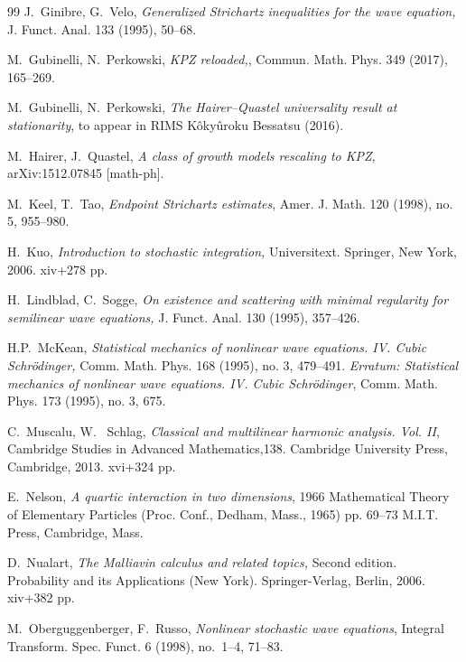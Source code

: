 \documentclass[letterpaper, 11pt,  reqno]{amsart}
\newcommand{\1}{\hspace{0.5mm}\text{I}\hspace{0.5mm}}
\numberwithin{equation}{section}
\numberwithin{theorem}{section}
\begin{document}
\begin{thebibliography}{99}
J.~Ginibre, G.~Velo, 
{\it Generalized Strichartz inequalities for the wave equation,} J. Funct. Anal. 133 (1995),
50--68.



M.~Gubinelli, N.~Perkowski, 
{\it   KPZ reloaded,},
Commun. Math. Phys. 349 (2017), 165--269.


M.~Gubinelli, N.~Perkowski, 
{\it The Hairer--Quastel universality result at stationarity}, 
 to appear in RIMS K\^oky\^uroku Bessatsu (2016).


M.~Hairer, J.~Quastel,
{\it A class of growth models rescaling to KPZ,}
arXiv:1512.07845 [math-ph].




M.~Keel, T.~Tao, {\it Endpoint Strichartz estimates},  Amer. J. Math. 120 (1998), no. 5, 955--980.


H.~Kuo, 
{\it Introduction to stochastic integration,} Universitext. Springer, New York, 2006. xiv+278 pp.


H.~Lindblad, C.~Sogge, {\it On existence and scattering with minimal regularity for semilinear wave equations,} J. Funct. Anal. 130 (1995), 357--426.




H.P.~McKean, 
{\it Statistical mechanics of nonlinear wave equations. IV. Cubic Schr\"odinger,} 
 Comm. Math. Phys. 168 (1995), no. 3, 479--491. 
 {\it Erratum: Statistical mechanics of nonlinear wave equations. IV. Cubic Schr\"odinger}, Comm. Math. Phys. 173 (1995), no. 3, 675.



C.~Muscalu, W.~ Schlag,
 {\it Classical and multilinear harmonic analysis. {V}ol. {II}},
 Cambridge Studies in Advanced Mathematics,138. Cambridge University Press, Cambridge, 2013. 
xvi+324 pp. 


E.~Nelson, 
{\it A quartic interaction in two dimensions}, 
 1966 Mathematical Theory of Elementary Particles (Proc. Conf., Dedham, Mass., 1965) pp. 69--73 M.I.T. Press, Cambridge, Mass.



D.~Nualart, 
{\it The Malliavin calculus and related topics,} Second edition. Probability and its Applications (New York). Springer-Verlag, Berlin, 2006. xiv+382 pp.



M.~Oberguggenberger, F.~Russo, 
{\it Nonlinear stochastic wave equations}, Integral Transform. Spec. Funct.  6 (1998), no.~1--4, 71--83. %



\end{thebibliography}
\end{document}

